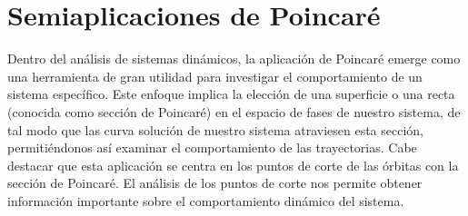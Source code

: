 \documentclass[12pt,a4paper]{report} %
\begin{document}

	
	\chapter{Semiaplicaciones de Poincaré}
	\label{sec:4}
	
	Dentro del análisis de sistemas dinámicos, la aplicación de Poincaré emerge como una herramienta de gran utilidad para investigar el comportamiento de un sistema específico. Este enfoque implica la elección de una superficie o una recta (conocida como sección de Poincaré) en el espacio de fases de nuestro sistema, de tal modo que las curva solución de  nuestro sistema atraviesen esta sección, permitiéndonos así examinar el comportamiento de las trayectorias. Cabe destacar que esta aplicación se centra en los puntos de corte de las órbitas con la sección de Poincaré. El análisis de los puntos de corte nos permite obtener información importante sobre el comportamiento dinámico del sistema.
	
\end{document}
